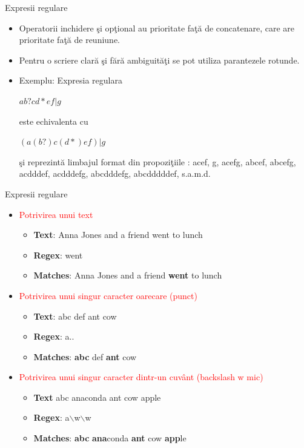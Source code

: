 \documentclass[pdf]{beamer}
\begin{document}
\begin{frame}{Expresii regulare}
\begin{itemize}
\item
Operatorii inchidere şi opţional au prioritate faţă de concatenare, care are prioritate faţă de reuniune.
\item
Pentru o scriere clară şi fără ambiguităţi se pot utiliza parantezele rotunde.

\item
Exemplu: Expresia regulara 

\begin{center}
$ab?cd*ef|g$ 
\end{center}

este echivalenta cu 

\begin{center}
$(a(b?)c(d*)ef)|g$
\end{center}

şi reprezintă limbajul format din propoziţiile : acef, g, acefg, abcef, abcefg, acdddef, acdddefg, abcdddefg, abcdddddef, s.a.m.d.
\end{itemize}
\end{frame}

\begin{frame}{Expresii regulare}
\begin{itemize} 
\item \textcolor{red}{Potrivirea unui text} 
	\begin{itemize}
	\item
	\textbf{Text}:    Anna Jones and a friend went to lunch 
	\item
	\textbf{Regex}:    went 
	\item
	\textbf{Matches}: Anna Jones and a friend \textbf{went} to lunch 
	\end{itemize}
	
\item \textcolor{red}{Potrivirea unui singur caracter oarecare (punct)}
	\begin{itemize}
	\item
	\textbf{Text}:       abc def ant cow 	
	\item
	\textbf{Regex}:    a.. 	
	\item
	\textbf{Matches}: \textbf{abc} def \textbf{ant} cow 
	\end{itemize}
	
\item \textcolor{red}{Potrivirea unui singur caracter dintr-un cuvânt (backslash w mic)}
	\begin{itemize}
	\item
	\textbf{Text}       abc anaconda ant cow apple 
	\item
	\textbf{Regex}:     a$\backslash$w$\backslash$w 
	\item
	\textbf{Matches}: \textbf{abc} \textbf{ana}conda \textbf{ant} cow \textbf{app}le
	\end{itemize}	
\end{itemize}
\end{frame}
\end{document}
